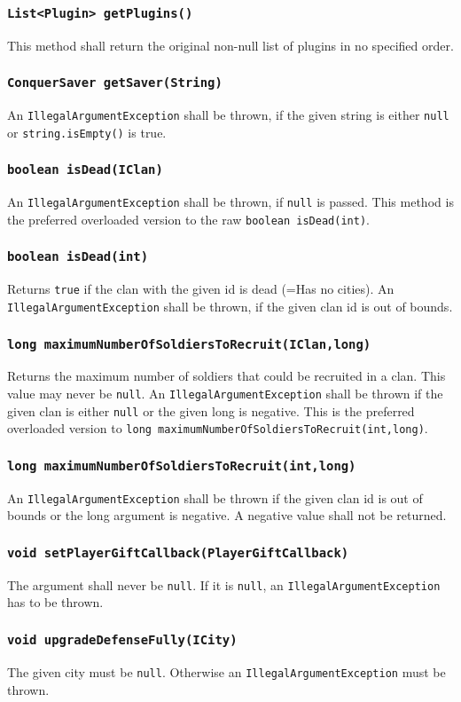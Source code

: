 \documentclass{article}
\begin{document}
\subsubsection{\texttt{List<Plugin> getPlugins()}}
This method shall return the original non-null list of plugins in no specified order.

\subsubsection{\texttt{ConquerSaver getSaver(String)}}

An \texttt{IllegalArgumentException} shall be thrown, if the given
string is either \texttt{null} or \texttt{string.isEmpty()} is true.

\subsubsection{\texttt{boolean isDead(IClan)}}
An \texttt{IllegalArgumentException} shall be thrown, if \texttt{null} is passed.
This method is the preferred overloaded version to the raw \texttt{boolean isDead(int)}.

\subsubsection{\texttt{boolean isDead(int)}}
Returns \texttt{true} if the clan with the given id is dead (=Has no cities).
An \texttt{IllegalArgumentException} shall be thrown, if the given clan id is out of bounds.

\subsubsection{\texttt{long maximumNumberOfSoldiersToRecruit(IClan,long)}}
Returns the maximum number of soldiers that could be recruited in a clan. This value may never be \texttt{null}.
An \texttt{IllegalArgumentException} shall be thrown if the given clan is either \texttt{null} or the given long is negative.
This is the preferred overloaded version to \texttt{long maximumNumberOfSoldiersToRecruit(int,long)}.

\subsubsection{\texttt{long maximumNumberOfSoldiersToRecruit(int,long)}}
An \texttt{IllegalArgumentException} shall be thrown if the given clan id is out of bounds or the long argument is negative.
A negative value shall not be returned.

\subsubsection{\texttt{void setPlayerGiftCallback(PlayerGiftCallback)}}
The argument shall never be \texttt{null}.
If it is \texttt{null}, an \texttt{IllegalArgumentException} has to be thrown.

\subsubsection{\texttt{void upgradeDefenseFully(ICity)}}
The given city must be \texttt{null}.
Otherwise an \texttt{IllegalArgumentException} must be thrown.
\end{document}
